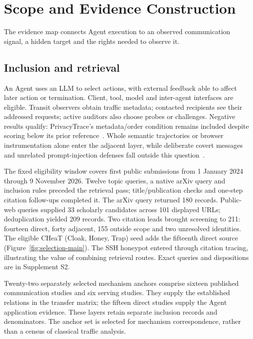 \section{Scope and Evidence Construction}\label{sec:scope}
The evidence map connects Agent execution to an observed communication signal, a hidden target and the rights needed to observe it.

\subsection{Inclusion and retrieval}
An Agent uses an LLM to select actions, with external feedback able to affect later action or termination. Client, tool, model and inter-agent interfaces are eligible. Transit observers obtain traffic metadata; contacted recipients see their addressed requests; active auditors also choose probes or challenges. Negative results qualify: PrivacyTrace's metadata/order condition remains included despite scoring below its prior reference~\cite{duan2026privacytrace}. Whole semantic trajectories or browser instrumentation alone enter the adjacent layer, while deliberate covert messages and unrelated prompt-injection defenses fall outside this question~\cite{yao2026intentminer,uitraces2026}.

The fixed eligibility window covers first public submissions from 1 January 2024 through 9 November 2026. Twelve topic queries, a native arXiv query and inclusion rules preceded the retrieval pass; title/publication checks and one-step citation follow-ups completed it. The arXiv query returned 180 records. Public-web queries supplied 33 scholarly candidates across 101 displayed URLs; deduplication yielded 209 records. Two citation leads brought screening to 211: fourteen direct, forty adjacent, 155 outside scope and two unresolved identities. The eligible CHeaT (Cloak, Honey, Trap) seed adds the fifteenth direct source (Figure~\ref{fig:selection-main}). The SSH honeypot entered through citation tracing, illustrating the value of combining retrieval routes. Exact queries and dispositions are in Supplement S2.


Twenty-two separately selected mechanism anchors comprise sixteen published communication studies and six serving studies. They supply the established relations in the transfer matrix; the fifteen direct studies supply the Agent application evidence. These layers retain separate inclusion records and denominators. The anchor set is selected for mechanism correspondence, rather than a census of classical traffic analysis.

